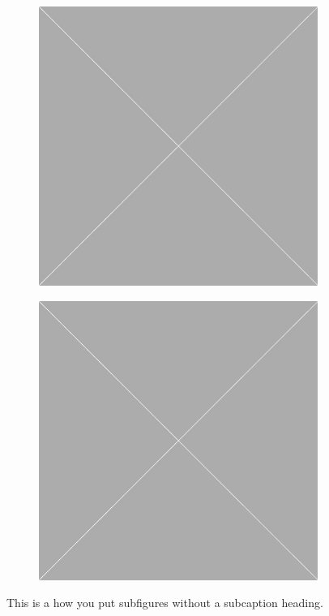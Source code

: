 \documentclass[10pt,oneside]{book}
\begin{document}
\begin{figure}
    \centering
    \begin{subfigure}[b]{0.45\linewidth}
      \includegraphics[width=\linewidth]{Pictures/placeholder.jpg}
    \end{subfigure}
    \qquad
    \begin{subfigure}[b]{0.45\linewidth}
      \includegraphics[width=\linewidth]{Pictures/placeholder.jpg}
    \end{subfigure}
  \caption{This is a how you put subfigures without a subcaption heading.}
\end{figure}
\end{document}
